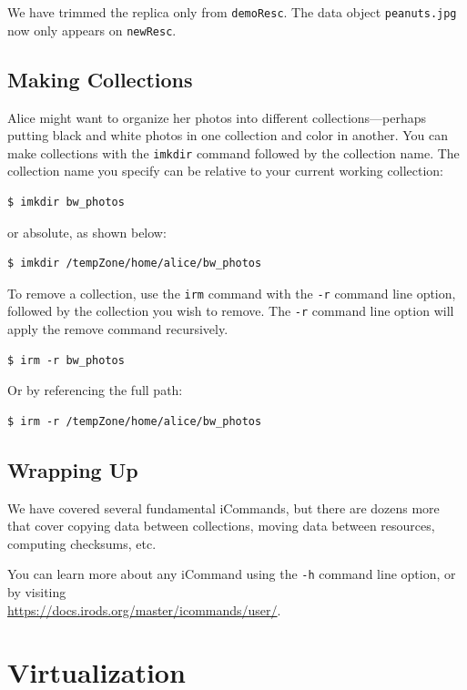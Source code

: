 \documentclass[10pt,oneside]{memoir}
\begin{document}
We have trimmed the replica only from \texttt{demoResc}. The data object \texttt{peanuts.jpg} now only appears on \texttt{newResc}.

\section{Making Collections}

Alice might want to organize her photos into different collections---perhaps putting black and white photos in one collection and color in another. You can make collections with the \texttt{imkdir} command followed by the collection name. The collection name you specify can be relative to your current working collection:

\begin{lstlisting}
$ imkdir bw_photos
\end{lstlisting}

or absolute, as shown below:

\begin{lstlisting}
$ imkdir /tempZone/home/alice/bw_photos
\end{lstlisting}

To remove a collection, use the \texttt{irm} command with the \texttt{-r} command line option, followed by the collection you wish to remove. The \texttt{-r} command line option will apply the remove command recursively.

\begin{lstlisting}
$ irm -r bw_photos
\end{lstlisting}

Or by referencing the full path:

\begin{lstlisting}
$ irm -r /tempZone/home/alice/bw_photos
\end{lstlisting}

\section{Wrapping Up}

We have covered several fundamental iCommands, but there are dozens more that cover copying data between collections, moving data between resources, computing checksums, etc.

You can learn more about any iCommand using the \texttt{-h} command line option, or by visiting \\
\url{https://docs.irods.org/master/icommands/user/}.

\chapter{Virtualization}
\end{document}
